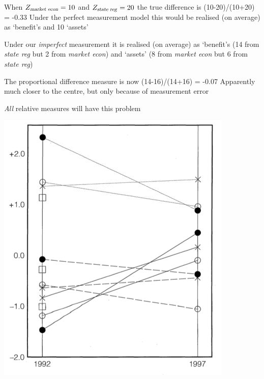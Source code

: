 \documentclass{mediumfoils}
\begin{document}

When $Z_{\text{\textsl{market econ}}}=10$ and $Z_{\text{\textsl{state reg}}}=20$ the true difference is 
\ita
\itm (10-20)/(10+20) = -0.33
\itz
Under the perfect measurement model this would be realised (on average) as 
\ita
{} `benefit's and 10 `assets'
\itz


Under our \textit{imperfect} measurement it is realised (on average) as 
\ita
{} `benefit's (14 from \textsl{state reg} but 2 from \textsl{market econ}) and
 `assets' (8 from \textsl{market econ} but 6 from \textsl{state reg})
\itz


The proportional difference measure is now (14-16)/(14+16) = -0.07
\ita
\itm Apparently much closer to the centre, but only because of measurement error
\itz

\textit{All} relative measures will have this problem



 

\centerline{\includegraphics[scale=.7]{pictures/lg-shrinkage}}
 
 
\end{document}
